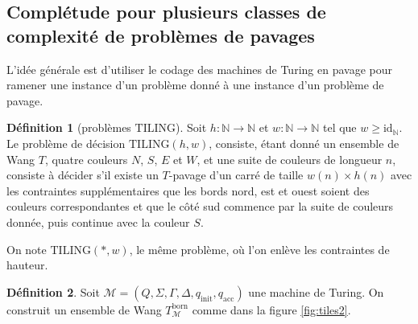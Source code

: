 \documentclass{scrartcl}
\renewcommand{\ge}{\geqslant}
\newcommand{\N}{\mathbb N}
\newcommand{\id}{\mathrm{id}}
\theoremstyle{definition}
\newtheorem{definition}{Définition}
\theoremstyle{remark}
\begin{document}
\subsection{Complétude pour plusieurs classes de complexité de problèmes de pavages}

L'idée générale est d'utiliser le codage des machines de Turing en pavage pour ramener une instance d'un problème donné à une instance d'un problème de pavage.  

\begin{definition}[problèmes $\mathrm{TILING}$]
  Soit $h:\N\to\N$ et $w:\N\to\N$ tel que $w\ge\id_\N$. Le problème de décision $\mathrm{TILING}(h,w)$, consiste, étant donné un ensemble de Wang $T$, quatre couleurs $N$, $S$, $E$ et $W$, et une suite de couleurs de longueur $n$, consiste à décider s'il existe un $T$-pavage d'un carré de taille $w(n)\times h(n)$ avec les contraintes supplémentaires que les bords nord, est et ouest soient des couleurs correspondantes et que le côté sud commence par la suite de couleurs donnée, puis continue avec la couleur $S$.

  On note $\mathrm{TILING}(*,w)$, le même problème, où l'on enlève les contraintes de hauteur.
\end{definition}

\begin{definition}
  Soit $\mathcal M=(Q,\Sigma,\Gamma, \Delta, q_\mathrm{init}, q_\mathrm{acc})$ une machine de Turing. On construit un ensemble de Wang $T^{\mathrm{born}}_\mathcal M$ comme dans la figure \ref{fig:tiles2}.
\end{definition}
\end{document}
